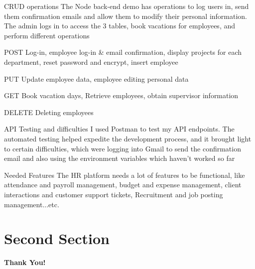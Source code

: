 \documentclass[aspectratio=169,xcolor=dvipsnames]{beamer}
\begin{document}
	\begin{frame}{CRUD operations}
		The Node back-end demo has operations to log users in, send them confirmation emails and allow them to modify their personal information. The admin logs in to access the 3 tables, book vacations for employees, and perform different operations
		
		\begin{block}{POST}
			Log-in, employee log-in & email confirmation, display projects for each department, reset password and encrypt, insert employee
		\end{block}
		
		\begin{block}{PUT}
			Update employee data, employee editing personal data
		\end{block}
		
		\begin{block}{GET}
			Book vacation days, Retrieve employees, obtain supervisor information
		\end{block}
		
		\begin{block}{DELETE}
			Deleting employees
		\end{block}
	\end{frame}
	
	\begin{frame}{API Testing and difficulties}
		I used Postman to test my API endpoints. The automated testing helped expedite the development process, and it brought light to certain difficulties, which were logging into Gmail to send the confirmation email and also using the environment variables which haven't worked so far  
	\end{frame}
	
	\begin{frame}{Needed Features}
		The HR platform needs a lot of features to be functional, like attendance and payroll management, budget and expense management, client interactions and customer support tickets, Recruitment and job posting management...etc. 
	\end{frame}
	
	\section{Second Section}
	
	
	\begin{frame}
		\Huge{\centerline{\textbf{Thank You!}}}
	\end{frame}
	
	
\end{document}
